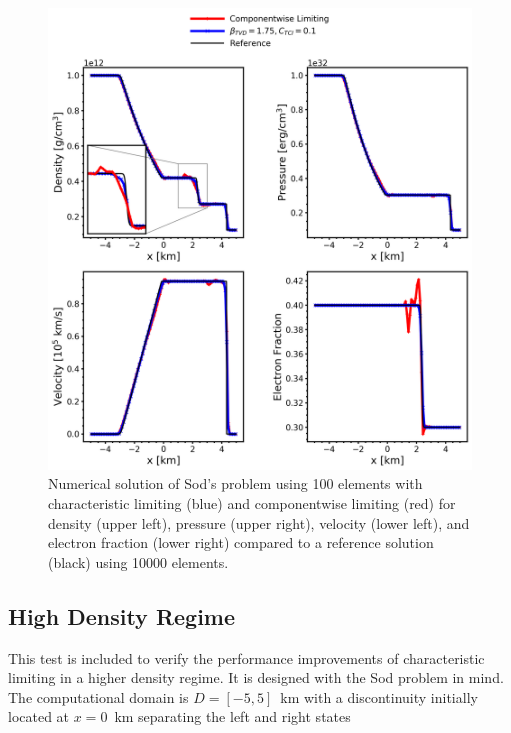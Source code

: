 \documentclass[onecolumn]{aastex62}
\begin{document}

\begin{figure}[h!]
  \centering
  \includegraphics[width=36pc]{./figures/characteristic_cw.png}
  \caption{\label{fig:SodSedovCW} Numerical solution of Sod's problem using
  100 elements with characteristic limiting (blue) and componentwise limiting
  (red) for density (upper left), pressure (upper right),
  velocity (lower left), and electron fraction (lower right)
  compared to a reference solution (black) using 10000 elements.}
\end{figure}
\clearpage
\vspace{1cm}
\subsection{High Density Regime}
This test is included to verify the performance improvements of characteristic
limiting in a higher density regime. It is designed with the Sod problem in mind.
The computational domain is $D = [-5,5]$~km
with a discontinuity initially located at $x = 0$~km separating the left and right states
\end{document}
